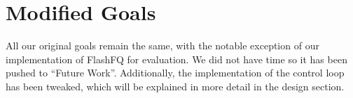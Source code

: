 \section{Modified Goals}

All our original goals remain the same, with the notable exception of
our implementation of FlashFQ for evaluation. We did not have time so it
has been pushed to ``Future Work''. Additionally, the implementation
of the control loop has been tweaked, which will be explained in more
detail in the design section.
